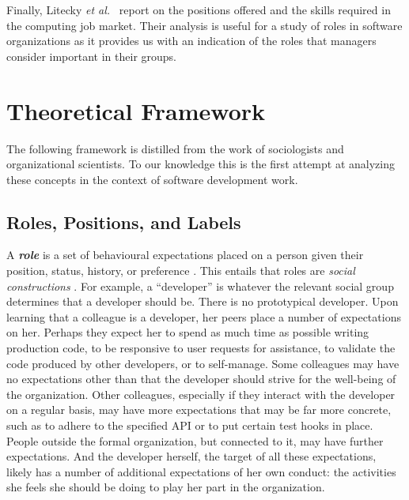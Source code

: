 \documentclass[10pt, conference, compsocconf]{IEEEtran}
\begin{document}
Finally, Litecky \emph{et al.}\ \cite{Litecky2010} report on the positions offered and the skills required in the computing job market. Their analysis is useful for a study of roles in software organizations as it provides us with an indication of the roles that managers consider important in their groups.




\section{Theoretical Framework}

The following framework is distilled from the work of sociologists and organizational scientists. To our knowledge this is the first attempt at analyzing these concepts in the context of software development work.


\subsection{Roles, Positions, and Labels}

A \textbf{\emph{role}} is a set of behavioural expectations placed on a person given their position, status, history, or preference \cite{Turner1956,Gordon1976,Rizzo1970}. This entails that roles are \emph{social constructions} \cite{Berger1967}. For example, a ``developer'' is whatever the relevant social group determines that a developer should be. There is no prototypical developer. Upon learning that a colleague is a developer, her peers place a number of expectations on her. Perhaps they expect her to spend as much time as possible writing production code, to be responsive to user requests for assistance, to validate the code produced by other developers, or to self-manage. Some colleagues may have no expectations other than that the developer should strive for the well-being of the organization. Other colleagues, especially if they interact with the developer on a regular basis, may have more expectations that may be far more concrete, such as to adhere to the specified API or to put certain test hooks in place. People outside the formal organization, but connected to it, may have further expectations. And the developer herself, the target of all these expectations, likely has a number of additional expectations of her own conduct: the activities she feels she should be doing to play her part in the organization.
\end{document}

